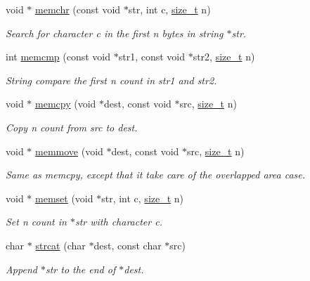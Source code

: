 \begin{DoxyCompactItemize}
\item 
void $\ast$ \mbox{\hyperlink{a00071_af2c756015b1cb92274fc019a175ae8bb}{memchr}} (const void $\ast$str, int c, \mbox{\hyperlink{a00074_a43b4547e12226fef871eed8afe191ad7}{size\+\_\+t}} n)
\begin{DoxyCompactList}\small\item\em Search for character c in the first n bytes in string $\ast$str. \end{DoxyCompactList}\item 
int \mbox{\hyperlink{a00071_ace6c4869ab3af01c6f27eac47773917a}{memcmp}} (const void $\ast$str1, const void $\ast$str2, \mbox{\hyperlink{a00074_a43b4547e12226fef871eed8afe191ad7}{size\+\_\+t}} n)
\begin{DoxyCompactList}\small\item\em String compare the first n count in str1 and str2. \end{DoxyCompactList}\item 
void $\ast$ \mbox{\hyperlink{a00071_a14938524dcbeb59d7117ba5e151ad1b1}{memcpy}} (void $\ast$dest, const void $\ast$src, \mbox{\hyperlink{a00074_a43b4547e12226fef871eed8afe191ad7}{size\+\_\+t}} n)
\begin{DoxyCompactList}\small\item\em Copy n count from src to dest. \end{DoxyCompactList}\item 
void $\ast$ \mbox{\hyperlink{a00071_a802c986820d3866639922b6bc9484f90}{memmove}} (void $\ast$dest, const void $\ast$src, \mbox{\hyperlink{a00074_a43b4547e12226fef871eed8afe191ad7}{size\+\_\+t}} n)
\begin{DoxyCompactList}\small\item\em Same as memcpy, except that it take care of the overlapped area case. \end{DoxyCompactList}\item 
void $\ast$ \mbox{\hyperlink{a00071_a48a16bf628904bdd1b28cbaedf934868}{memset}} (void $\ast$str, int c, \mbox{\hyperlink{a00074_a43b4547e12226fef871eed8afe191ad7}{size\+\_\+t}} n)
\begin{DoxyCompactList}\small\item\em Set n count in $\ast$str with character c. \end{DoxyCompactList}\item 
char $\ast$ \mbox{\hyperlink{a00071_adb8723e585ed29f2370cddf90f6891bc}{strcat}} (char $\ast$dest, const char $\ast$src)
\begin{DoxyCompactList}\small\item\em Append $\ast$str to the end of $\ast$dest. \end{DoxyCompactList}\item 

\end{DoxyCompactItemize}
